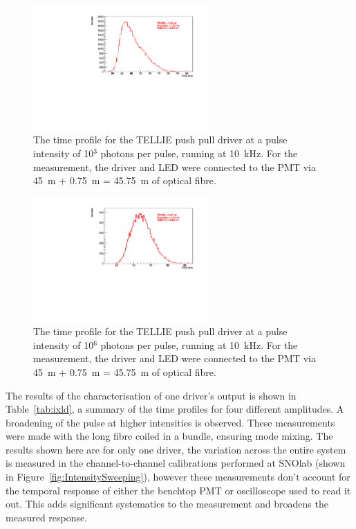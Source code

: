 \documentclass[12pt]{report}
\begin{document}
\begin{figure}[htbp]
	\begin{center}
		\includegraphics[width=0.6\textwidth]{DriverProfile_1e3}
		\caption{The time profile for the TELLIE push pull driver at a pulse intensity of 10$^3$ photons per pulse, running at 10~kHz. For the measurement, the driver and LED were connected to the PMT via 45~m + 0.75~m = 45.75~m of optical fibre.}
		\label{fig:DriverProfile_1e3}
	\end{center}
\end{figure}

\begin{figure}[htbp]
	\begin{center}
		\includegraphics[width=0.6\textwidth]{DriverProfile_1e6}
		\caption{The time profile for the TELLIE push pull driver at a pulse intensity of 10$^6$ photons per pulse, running at 10~kHz. For the measurement, the driver and LED were connected to the PMT via 45~m + 0.75~m = 45.75~m of optical fibre.}
		\label{fig:DriverProfile_1e6}
	\end{center}
\end{figure}

The results of the characterisation of one driver's output is shown in Table~\ref{tab:ixld}, a summary of the time profiles for four different amplitudes. A broadening of the pulse at higher intensities is observed. These measurements were made with the long fibre coiled in a bundle, ensuring mode mixing. The results shown here are for only one driver, the variation across the entire system is measured in the channel-to-channel calibrations performed at SNOlab (shown in Figure~\ref{fig:IntensitySweeping}), however these measurements don't account for the temporal response of either the benchtop PMT or oscilloscope used to read it out. This adds significant systematics to the measurement and broadens the measured response. 
\end{document}
